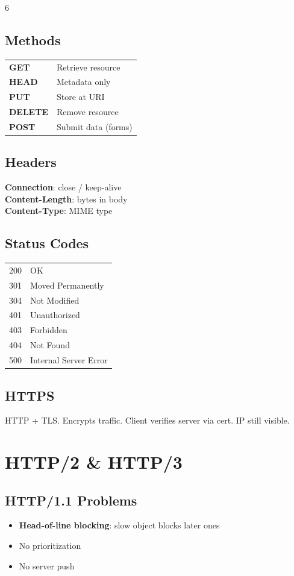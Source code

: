 \documentclass[10pt,landscape,letterpaper]{article}
\newcommand{\concept}[1]{\textcolor{conceptcyan}{\textbf{#1}}}
\newcommand{\important}[1]{\colorbox{highlightyellow}{#1}}
\begin{document}
\begin{multicols}{6}
\subsection{Methods}
\begin{tabular}{@{}ll@{}}
\concept{GET} & Retrieve resource \\
\concept{HEAD} & Metadata only \\
\concept{PUT} & Store at URI \\
\concept{DELETE} & Remove resource \\
\concept{POST} & Submit data (forms)
\end{tabular}

\subsection{Headers}
\concept{Connection}: close / keep-alive\\
\concept{Content-Length}: bytes in body\\
\concept{Content-Type}: MIME type

\subsection{Status Codes}
\begin{tabular}{@{}ll@{}}
\important{200} & OK \\
\important{301} & Moved Permanently \\
\important{304} & Not Modified \\
\important{401} & Unauthorized \\
\important{403} & Forbidden \\
\important{404} & Not Found \\
\important{500} & Internal Server Error
\end{tabular}

\subsection{HTTPS}
HTTP + TLS. Encrypts traffic. Client verifies server via cert. IP still visible.

\section{HTTP/2 \& HTTP/3}
\subsection{HTTP/1.1 Problems}
\begin{itemize}
\item \concept{Head-of-line blocking}: slow object blocks later ones
\item No prioritization
\item No server push
\end{itemize}


\end{multicols}
\end{document}
